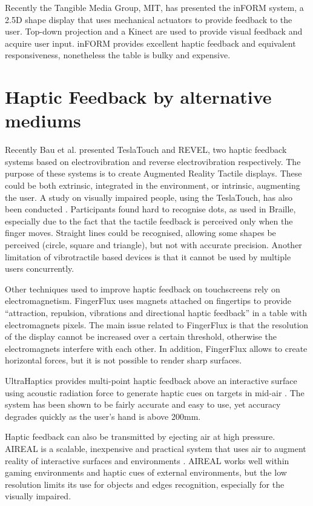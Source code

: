 Recently the Tangible Media Group, MIT, has presented the inFORM system, a 2.5D shape display that uses mechanical actuators to provide feedback to the user\cite{follmer2013inform}. Top-down projection and a Kinect are used to provide visual feedback and acquire user input. inFORM provides excellent haptic feedback and equivalent responsiveness, nonetheless the table is bulky and expensive.

\section{Haptic Feedback by alternative mediums}

Recently Bau et al. presented TeslaTouch\cite{bau2010teslatouch} and REVEL\cite{bau2012revel}, two haptic feedback systems based on electrovibration and reverse electrovibration respectively. The purpose of these systems is to create Augmented Reality Tactile displays. These could be both extrinsic, integrated in the environment, or intrinsic, augmenting the user. A study on visually impaired people, using the TeslaTouch, has also been conducted \cite{xu2011tactile}. Participants found hard to recognise dots, as used in Braille, especially due to the fact that the tactile feedback is perceived only when the finger moves. Straight lines could be recognised, allowing some shapes be perceived (circle, square and triangle), but not with accurate precision. Another limitation of vibrotractile based devices is that it cannot be used by multiple users concurrently. 

Other techniques used to improve haptic feedback on touchscreens rely on electromagnetism. FingerFlux \cite{weiss2011fingerflux} uses magnets attached on fingertips to provide ``attraction, repulsion, vibrations and directional haptic feedback'' in a table with electromagnets pixels. The main issue related to FingerFlux is that the resolution of the display cannot be increased over a certain threshold, otherwise the electromagnets interfere with each other. In addition, FingerFlux allows to create horizontal forces, but it is not possible to render sharp surfaces.    

UltraHaptics provides multi-point haptic feedback above an interactive surface using acoustic radiation force to generate haptic cues on targets in mid-air \cite{carter2013ultrahaptics}. The system has been shown to be fairly accurate and easy to use, yet accuracy degrades quickly as the user's hand is above 200mm. 

Haptic feedback can also be transmitted by ejecting air at high pressure. AIREAL is a scalable, inexpensive and practical system that uses air to augment reality of interactive surfaces and environments \cite{sodhi2013aireal}. AIREAL works well within gaming environments and haptic cues of external environments, but the low resolution limits its use for objects and edges recognition, especially for the visually impaired.